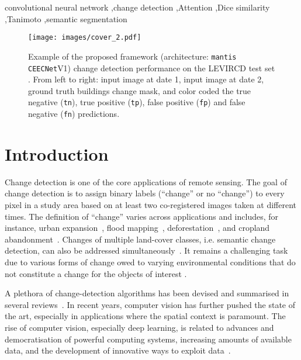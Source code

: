 \documentclass[times, 5p]{elsarticle}
\newcommand{\ceecnet}{\texttt{CEECNet}}
\newcommand{\mantis}{\texttt{mantis}}
\begin{document}
\begin{frontmatter}
\begin{keyword}
convolutional neural network \sep change detection \sep Attention \sep Dice similarity \sep Tanimoto
\sep  semantic segmentation
\end{keyword}

\end{frontmatter}




\begin{figure*}[h!]
\centering
\texttt{[image: images/cover\_2.pdf]}
\caption{Example of the proposed framework (architecture: \mantis{} \ceecnet{}V1) change detection performance on the LEVIRCD test set \citep{rs12101662}. From left to right:  input image at date 1,  input image at date 2, ground truth buildings change mask, and color coded the  true negative (\texttt{tn}), true positive (\texttt{tp}), false positive (\texttt{fp}) and false negative (\texttt{fn}) predictions.} 
\label{cover}
\end{figure*}


\section{Introduction}

Change detection is one of the core applications of remote sensing. 
The goal of change detection is to assign binary labels (``change'' or no ``change'') to every pixel in a study area based on at least two co-registered images taken at different times. The definition of ``change'' varies across applications and includes, for instance, urban expansion~\citep{rs12101662}, flood mapping~\citep{giustarini2012change}, deforestation~\citep{morton2005rapid}, and cropland abandonment~\citep{low2018mapping}. Changes of multiple land-cover classes, i.e. semantic change detection, can also be addressed  simultaneously~\citep{daudt2019multitask}. It remains a challenging task due to various forms of change owed to varying environmental conditions that do not constitute a change for the objects of interest \citep{Varghese_2018_ECCV_Workshops}.  

A plethora of change-detection algorithms has been devised and summarised in several reviews~\citep{lu2004change, coppin2004review, hussain2013change, tewkesbury2015critical}. In recent years, computer vision has further pushed the state of the art, especially in applications where the spatial context is paramount. The rise of computer vision, especially deep learning, is related to advances and democratisation of powerful computing systems, increasing amounts of available data, and the development of innovative ways to exploit data~\citep{daudt2019multitask}. 
\end{document}
